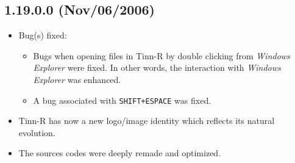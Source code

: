 \subsection*{1.19.0.0 (Nov/06/2006)}
\begin{itemize}
  \item Bug(s) fixed:
    \begin{itemize}
      \item Bugs when opening files in Tinn-R by double clicking from
        \textit{Windows Explorer} were fixed. In other words, the
        interaction with \textit{Windows Explorer} was enhanced.
      \item A bug associated with \texttt{SHIFT+ESPACE} was fixed.
    \end{itemize}
  \item Tinn-R has now a new logo/image identity which reflects
    its natural evolution.
  \item The sources codes were deeply remade and optimized.
\end{itemize}


